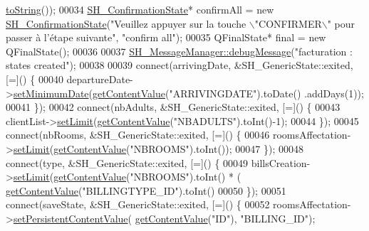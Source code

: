 \begin{DoxyCode}
      \hyperlink{classSH__GenericStateMachine_a85c0c1c9d258ae991f84667412fa47cd}{toString}());
00034     \hyperlink{classSH__ConfirmationState}{SH\_ConfirmationState}* confirmAll = \textcolor{keyword}{new} 
      \hyperlink{classSH__ConfirmationState}{SH\_ConfirmationState}(\textcolor{stringliteral}{"Veuillez appuyer sur la touche \(\backslash\)"CONFIRMER\(\backslash\)" pour passer à
       l'étape suivante"}, \textcolor{stringliteral}{"confirm all"});
00035     QFinalState* \textcolor{keyword}{final} = \textcolor{keyword}{new} QFinalState();
00036 
00037     \hyperlink{classSH__MessageManager_a379f2aa0a590a5add34dbe91f98b2ff7}{SH\_MessageManager::debugMessage}(\textcolor{stringliteral}{"facturation : states created"});
00038 
00039     connect(arrivingDate, &SH\_GenericState::exited, [=]() \{
00040         departureDate->\hyperlink{classSH__DateQuestionState_a28dba9f895682e7722c1a245e0aac713}{setMinimumDate}(\hyperlink{classSH__InOutStateMachine_aa1a3bd3c0ea8a59b9bc916dc718eb9ca}{getContentValue}(\textcolor{stringliteral}{"ARRIVINGDATE"}).toDate()
      .addDays(1));
00041     \});
00042     connect(nbAdults, &SH\_GenericState::exited, [=]() \{
00043         clientList->\hyperlink{classSH__LoopingInOutStateMachine_a6dbf2fbcc6524bba5a70baadb8d61be4}{setLimit}(\hyperlink{classSH__InOutStateMachine_aa1a3bd3c0ea8a59b9bc916dc718eb9ca}{getContentValue}(\textcolor{stringliteral}{"NBADULTS"}).toInt()-1);
00044     \});
00045     connect(nbRooms, &SH\_GenericState::exited, [=]() \{
00046         roomsAffectation->\hyperlink{classSH__LoopingInOutStateMachine_a6dbf2fbcc6524bba5a70baadb8d61be4}{setLimit}(\hyperlink{classSH__InOutStateMachine_aa1a3bd3c0ea8a59b9bc916dc718eb9ca}{getContentValue}(\textcolor{stringliteral}{"NBROOMS"}).toInt());
00047     \});
00048     connect(type, &SH\_GenericState::exited, [=]() \{
00049         billsCreation->\hyperlink{classSH__LoopingInOutStateMachine_a6dbf2fbcc6524bba5a70baadb8d61be4}{setLimit}(\hyperlink{classSH__InOutStateMachine_aa1a3bd3c0ea8a59b9bc916dc718eb9ca}{getContentValue}(\textcolor{stringliteral}{"NBROOMS"}).toInt() * (
      \hyperlink{classSH__InOutStateMachine_aa1a3bd3c0ea8a59b9bc916dc718eb9ca}{getContentValue}(\textcolor{stringliteral}{"BILLINGTYPE\_ID"}).toInt() %
00050     \});
00051     connect(saveState, &SH\_GenericState::exited, [=]() \{
00052         roomsAffectation->\hyperlink{classSH__LoopingInOutStateMachine_a99686121d80e3de4c64bebb1d5890ac0}{setPersistentContentValue}(
      \hyperlink{classSH__InOutStateMachine_aa1a3bd3c0ea8a59b9bc916dc718eb9ca}{getContentValue}(\textcolor{stringliteral}{"ID"}), \textcolor{stringliteral}{"BILLING\_ID"});

\end{DoxyCode}
